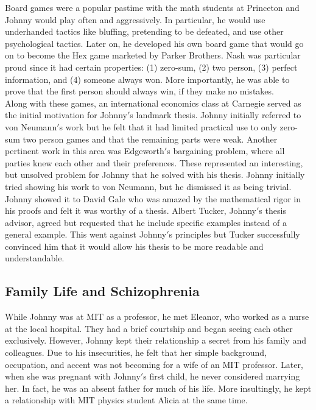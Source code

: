 \documentclass[12pt]{article}
\begin{document}
Board games were a popular pastime with the math students at Princeton and Johnny would play often and aggressively. In particular, he would use underhanded tactics like bluffing, pretending to be defeated, and use other psychological tactics. Later on, he developed his own board game that would go on to become the Hex game marketed by Parker Brothers. Nash was particular proud since it had certain properties: (1) zero-sum, (2) two person, (3) perfect information, and (4) someone always won. More importantly, he was able to prove that the first person should always win, if they make no mistakes.\\

Along with these games, an international economics class at Carnegie served as the initial motivation for Johnny$'$s landmark thesis. Johnny initially referred to von Neumann$'$s work but he felt that it had limited practical use to only zero-sum two person games and that the remaining parts were weak. Another pertinent work in this area was Edgeworth$'$s bargaining problem, where all parties knew each other and their preferences. These represented an interesting, but unsolved problem for Johnny that he solved with his thesis. Johnny initially tried showing his work to von Neumann, but he dismissed it as being trivial. Johnny showed it to David Gale who was amazed by the mathematical rigor in his proofs and felt it was worthy of a thesis. Albert Tucker, Johnny$'$s thesis advisor, agreed but requested that he include specific examples instead of a general example. This went against Johnny$'$s principles but Tucker successfully convinced him that it would allow his thesis to be more readable and understandable. 

\subsection{Family Life and Schizophrenia}

While Johnny was at MIT as a professor, he met Eleanor, who worked as a nurse at the local hospital. They had a brief courtship and began seeing each other exclusively. However, Johnny kept their relationship a secret from his family and colleagues. Due to his insecurities, he felt that her simple background, occupation, and accent was not becoming for a wife of an MIT professor. Later, when she was pregnant with Johnny$'$s first child, he never considered marrying her. In fact, he was an absent father for much of his life. More insultingly, he kept a relationship with MIT physics student Alicia at the same time.\\
\end{document}
